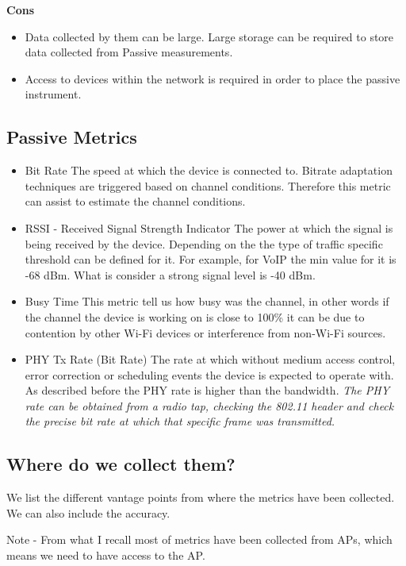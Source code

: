 \textbf{Cons}
\begin{itemize}
	\item Data collected by them can be large. Large storage can be required to store data collected from Passive measurements.
	\item Access to devices within the network is required in order to place the passive instrument.
	
\end{itemize}

\subsection*{Passive Metrics}

\begin{itemize}
	\item Bit Rate
	The speed at which the device is connected to. Bitrate adaptation techniques are triggered based on channel conditions. Therefore this metric can assist to estimate the channel conditions.
	\item RSSI - Received Signal Strength Indicator
	The power at which the signal is being received by the device. Depending on the the type of traffic specific threshold can be defined for it. For example, for VoIP the min value for it is -68 dBm. What is consider a strong signal level is -40 dBm.
	\item Busy Time
	This metric tell us how busy was the channel, in other words if the channel the device is working on is close to 100\% it can be due to contention by other Wi-Fi devices or interference from non-Wi-Fi sources.
	\item PHY Tx Rate (Bit Rate)
	The rate at which without medium access control, error correction or scheduling events the device is expected to operate with. As described before the PHY rate is higher than the bandwidth.
	\emph{The PHY rate can be obtained from a radio tap, checking the 802.11 header and check the precise bit rate at which that specific frame was transmitted.}
\end{itemize}

\subsection{Where do we collect them?}

We list the different vantage points from where the metrics have been collected. We can also include the accuracy.

Note - From what I recall most of metrics have been collected from APs, which means we need to have access to the AP.

